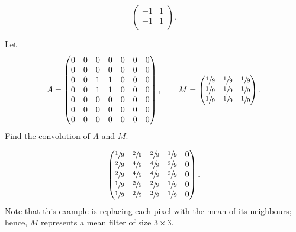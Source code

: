 \begin{solution}
    \[
        \begin{pmatrix}
            -1 & 1 \\
            -1 & 1 \\
        \end{pmatrix}
        .
    \]
\end{solution}

\begin{example}
    Let
    \[
        A =
        \begin{pmatrix}
            0 & 0 & 0 & 0 & 0 & 0 & 0 \\
            0 & 0 & 0 & 0 & 0 & 0 & 0 \\
            0 & 0 & 1 & 1 & 0 & 0 & 0 \\
            0 & 0 & 1 & 1 & 0 & 0 & 0 \\
            0 & 0 & 0 & 0 & 0 & 0 & 0 \\
            0 & 0 & 0 & 0 & 0 & 0 & 0 \\
            0 & 0 & 0 & 0 & 0 & 0 & 0 \\
        \end{pmatrix}
        ,\qquad M =
        \begin{pmatrix}
            \sfrac19 & \sfrac19 & \sfrac19 \\
            \sfrac19 & \sfrac19 & \sfrac19 \\
            \sfrac19 & \sfrac19 & \sfrac19 \\
        \end{pmatrix}
        .
    \]
    Find the convolution of $A$ and $M$.
\end{example}

\begin{solution}
    \[
        \begin{pmatrix}
            \sfrac19 & \sfrac29 & \sfrac29 & \sfrac19 & 0 \\
            \sfrac29 & \sfrac49 & \sfrac49 & \sfrac29 & 0 \\
            \sfrac29 & \sfrac49 & \sfrac49 & \sfrac29 & 0 \\
            \sfrac19 & \sfrac29 & \sfrac29 & \sfrac19 & 0 \\
            \sfrac19 & \sfrac29 & \sfrac29 & \sfrac19 & 0 \\
        \end{pmatrix}
        .
    \]
    Note that this example is replacing each pixel with the mean of its neighbours; hence, $M$ represents a mean filter of size $3 \times 3$.
\end{solution}

